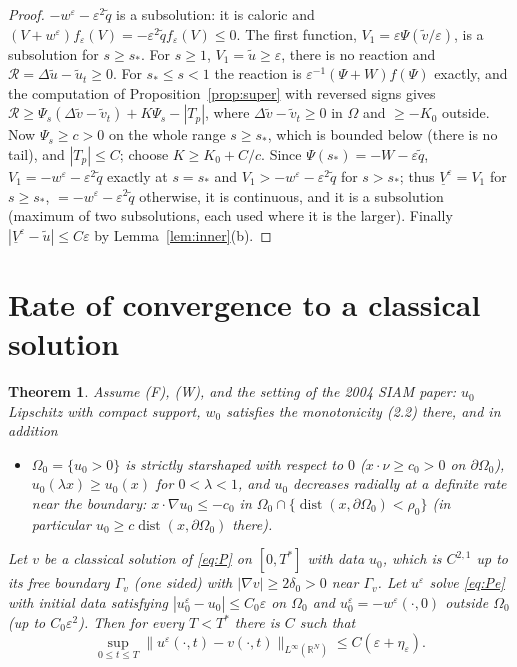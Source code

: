\documentclass[11pt]{amsart}
\newtheorem{theorem}{Theorem}[section]
\theoremstyle{definition}
\theoremstyle{remark}
\newcommand{\ve}{\varepsilon}
\newcommand{\R}{\mathbb{R}}
\begin{document}
\begin{proof}
$-w^\ve-\ve^2\tilde q$ is a subsolution: it is caloric and
$(V+w^\ve)f_\ve(V)=-\ve^2\tilde qf_\ve(V)\le0$. The first function, $V_1=\ve\Psi(\tilde v/\ve)$, is a subsolution for
$s\ge s_*$. For $s\ge1$, $V_1=\tilde u\ge\ve$, there is no reaction and
$\mathcal R=\Delta\tilde u-\tilde u_t\ge0$. For $s_*\le s<1$ the reaction is
$\ve^{-1}(\Psi+W)f(\Psi)$ exactly, and the computation of
Proposition~\ref{prop:super} with reversed signs gives
$\mathcal R\ge\Psi_s(\Delta\tilde v-\tilde v_t)+K\Psi_s-|T_p|$, where
$\Delta\tilde v-\tilde v_t\ge0$ in $\Omega$ and $\ge-K_0$ outside. Now
$\Psi_s\ge c>0$ on the whole range $s\ge s_*$, which is bounded below (there is
no tail), and $|T_p|\le C$; choose $K\ge K_0+C/c$. Since $\Psi(s_*)=-W-\ve\tilde q$,
$V_1=-w^\ve-\ve^2\tilde q$ exactly at $s=s_*$ and $V_1>-w^\ve-\ve^2\tilde q$ for
$s>s_*$; thus $\underline V^\ve=V_1$ for $s\ge s_*$, $=-w^\ve-\ve^2\tilde q$ otherwise,
it is continuous, and it is a subsolution (maximum of two subsolutions, each
used where it is the larger). Finally $|\underline V^\ve-\tilde u|\le C\ve$ by
Lemma~\ref{lem:inner}(b).
\end{proof}

\section{Rate of convergence to a classical solution}

\begin{theorem}\label{thm:rate}
Assume (F), (W), and the setting of the 2004 SIAM paper: $u_0$ Lipschitz with
compact support, $w_0$ satisfies the monotonicity (2.2) there, and in addition
\begin{itemize}
\item[(S$'$)] $\Omega_0=\{u_0>0\}$ is strictly starshaped with respect to $0$
($x\cdot\nu\ge c_0>0$ on $\partial\Omega_0$), $u_0(\lambda x)\ge u_0(x)$ for
$0<\lambda<1$, and $u_0$ decreases radially at a definite rate near the
boundary: $x\cdot\nabla u_0\le-c_0$ in $\Omega_0\cap\{\operatorname{dist}(x,\partial\Omega_0)<\rho_0\}$
(in particular $u_0\ge c\operatorname{dist}(x,\partial\Omega_0)$ there).
\end{itemize}
Let $v$ be a classical solution of \eqref{eq:P} on $[0,T^*]$ with data $u_0$,
which is $C^{2,1}$ up to its free boundary $\Gamma_v$ (one sided) with
$|\nabla v|\ge2\delta_0>0$ near $\Gamma_v$. Let $u^\ve$ solve \eqref{eq:Pe} with
initial data satisfying $|u_0^\ve-u_0|\le C_0\ve$ on $\Omega_0$ and
$u_0^\ve=-w^\ve(\cdot,0)$ outside $\Omega_0$ (up to $C_0\ve^2$). Then for every
$T<T^*$ there is $C$ such that
\[
\sup_{0\le t\le T}\|u^\ve(\cdot,t)-v(\cdot,t)\|_{L^\infty(\R^N)}\le C(\ve+\eta_\ve).
\]
\end{theorem}
\end{document}
